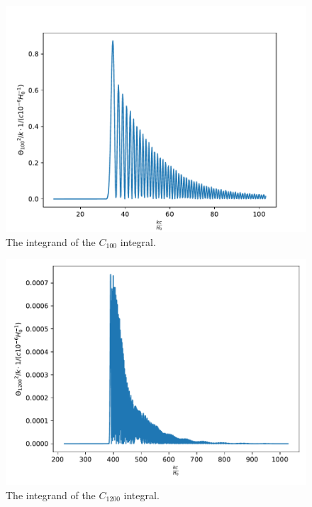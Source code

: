 \documentclass{aa}
\begin{document}
\begin{figure}[H]
   \includegraphics[scale=0.6]{../figures/milestone4/theta_100_squared.pdf}
   \caption{The integrand of the $C_{100}$ integral.}\label{fig:m4_theta100_squared}
\end{figure}

\begin{figure}[H]
   \includegraphics[scale=0.6]{../figures/milestone4/theta_1200_squared.pdf}
   \caption{The integrand of the $C_{1200}$ integral.}\label{fig:m4_theta1200_squared}
\end{figure}
\end{document}
